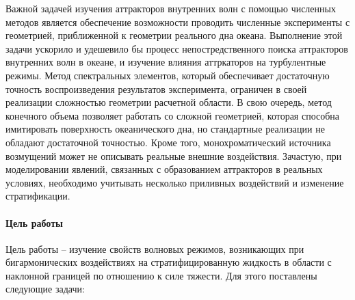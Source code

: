 \Introduction

Важной задачей изучения аттракторов внутренних волн с помощью численных методов является обеспечение возможности проводить численные эксперименты с геометрией, приближенной к геометрии реального дна океана. Выполнение этой задачи ускорило и удешевило бы процесс непостредственного поиска аттракторов внутренних волн в океане, и изучение влияния аттркаторов на турбулентные режимы. Метод спектральных элементов, который обеспечивает достаточную точность воспроизведения результатов эксперимента, ограничен в своей реализации сложностью геометрии расчетной области. В свою очередь, метод конечного объема позволяет работать со сложной геометрией, которая способна имитировать поверхность океанического дна, но стандартные реализации не обладают достаточной точностью. Кроме того, монохроматический источника возмущений может не описывать реальные внешние воздействия. Зачастую, при моделировании явлений, связанных с образованием аттракторов в реальных условиях, необходимо учитывать несколько приливных воздействий \cite{Garrett1972} и изменение стратификации.

\paragraph{Цель работы}

Цель работы -- изучение свойств волновых режимов, возникающих при бигармонических воздействиях на стратифицированную жидкость в области с наклонной границей по отношению к силе тяжести.
Для этого поставлены следующие задачи:

